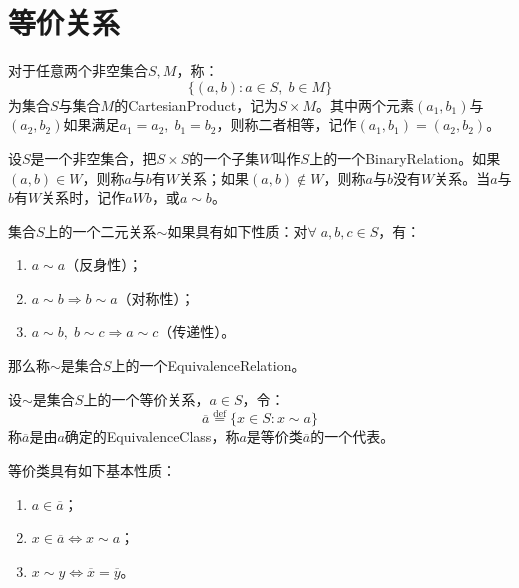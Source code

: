 \section{等价关系}

\begin{definition}\label{CartesianProduct}
	对于任意两个非空集合$S,M$，称：
	\begin{equation*}
		\{(a,b):a\in S,\;b\in M\}
	\end{equation*}
	为集合$S$与集合$M$的\gls{CartesianProduct}，记为$S\times M$。其中两个元素$(a_1,b_1)$与$(a_2,b_2)$如果满足$a_1=a_2,\;b_1=b_2$，则称二者相等，记作$(a_1,b_1)=(a_2,b_2)$。
\end{definition}
\begin{definition}
	设$S$是一个非空集合，把$S\times S$的一个子集$W$叫作$S$上的一个\gls{BinaryRelation}。如果$(a,b)\in W$，则称$a$与$b$有$W$关系；如果$(a,b)\notin W$，则称$a$与$b$没有$W$关系。当$a$与$b$有$W$关系时，记作$aWb$，或$a\sim b$。
\end{definition}
\begin{definition}
	集合$S$上的一个二元关系$\sim$如果具有如下性质：对$\forall\;a,b,c\in S$，有：
	\begin{enumerate}
		\item $a\sim a$（反身性）；
		\item $a\sim b\Rightarrow b\sim a$（对称性）；
		\item $a\sim b,\;b\sim c\Rightarrow a\sim c$（传递性）。
	\end{enumerate}
	那么称$\sim$是集合$S$上的一个\gls{EquivalenceRelation}。
\end{definition}
\begin{definition}
	设$\sim$是集合$S$上的一个等价关系，$a\in S$，令：
	\begin{equation*}
		\overline{a}\overset{\mathrm{def}}{=}\{x\in S:x\sim a\}
	\end{equation*}
	称$\overline{a}$是由$a$确定的\gls{EquivalenceClass}，称$a$是等价类$\overline{a}$的一个代表。
\end{definition}
\begin{property}
	等价类具有如下基本性质：
	\begin{enumerate}
		\item $a\in\overline{a}$；
		\item $x\in\overline{a}\Leftrightarrow x\sim a$；
		\item $x\sim y\Leftrightarrow\overline{x}=\overline{y}$。
	\end{enumerate}
\end{property}
